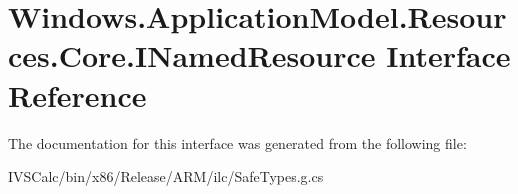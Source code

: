 \hypertarget{interface_windows_1_1_application_model_1_1_resources_1_1_core_1_1_i_named_resource}{}\section{Windows.\+Application\+Model.\+Resources.\+Core.\+I\+Named\+Resource Interface Reference}
\label{interface_windows_1_1_application_model_1_1_resources_1_1_core_1_1_i_named_resource}


The documentation for this interface was generated from the following file\+:\begin{DoxyCompactItemize}
\item 
I\+V\+S\+Calc/bin/x86/\+Release/\+A\+R\+M/ilc/Safe\+Types.\+g.\+cs\end{DoxyCompactItemize}
